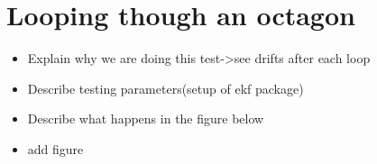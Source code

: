 \section{Looping though an octagon}\label{sec:octagon}

\begin{itemize}
 \item Explain why we are doing this test->see drifts after each loop
 \item Describe testing parameters(setup of ekf package)
 \item Describe what happens in the figure below
 \item add figure
\end{itemize}
